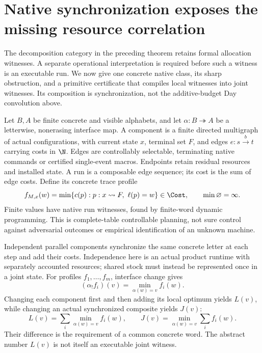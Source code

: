 \section{Native synchronization exposes the missing resource correlation}
\label{sec:native}
The decomposition category in the preceding theorem retains formal
allocation witnesses. A separate operational interpretation is required
before such a witness is an executable run. We now give one concrete
native class, its sharp obstruction, and a primitive certificate that
compiles local witnesses into joint witnesses. Its composition is
synchronization, not the additive-budget Day convolution above.

Let $B,A$ be finite concrete and visible alphabets, and let
$\alpha:B\twoheadrightarrow A$ be a letterwise, nonerasing interface
map. A component is a finite directed multigraph of actual configurations,
with current state $x$, terminal set $F$, and edges
$e:s\xrightarrow{b}t$ carrying costs in $\N$. Edges are controllably
selectable, terminating native commands or certified single-event macros.
Endpoints retain residual resources and installed state. A run is a
composable edge sequence; its cost is the sum of edge costs.
Define its concrete trace profile
\[
 f_{M,x}(w)=\min\{c(p):p:x\leadsto F,\ \ell(p)=w\}\in\Cost,
 \qquad \min\varnothing=\infty.
\]
Finite values have native run witnesses, found by finite-word dynamic
programming. This is complete-table controllable planning, not sure
control against adversarial outcomes or empirical identification of an
unknown machine.

Independent parallel components synchronize the same concrete letter at
each step and add their costs. Independence here is an actual product
runtime with separately accounted resources; shared stock must instead
be represented once in a joint state. For profiles $f_1,\ldots,f_m$,
interface change gives
\[
 (\alpha_!f_i)(v)=\min_{\alpha(w)=v}f_i(w).
\]
Changing each component first and then adding its local optimum yields
$L(v)$, while changing an actual synchronized composite yields $J(v)$:
\[
 L(v)=\sum_i\min_{\alpha(w)=v}f_i(w),\qquad
 J(v)=\min_{\alpha(w)=v}\sum_i f_i(w).
\]
Their difference is the requirement of a common concrete word.
The abstract number $L(v)$ is not itself an executable joint witness.

